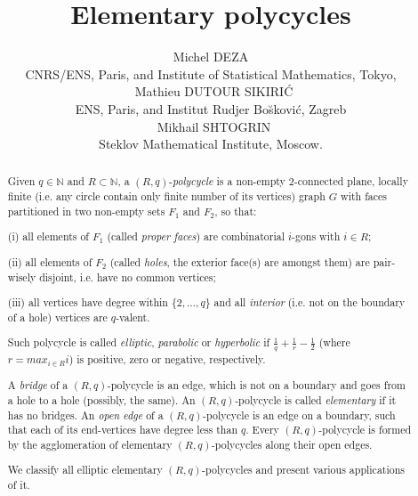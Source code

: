 \documentclass[12pt]{article}
\title{Elementary polycycles}
\date{}
\author{Michel DEZA\\
CNRS/ENS, Paris, and Institute of Statistical Mathematics, Tokyo,\\
\ Mathieu DUTOUR SIKIRI\'C\\
ENS, Paris, and Institut Rudjer Bo\u skovi\'c, Zagreb\\
\ Mikhail SHTOGRIN\\
Steklov Mathematical Institute, Moscow.
}
\begin{document}
\newcommand{\RR}{\ensuremath{\mathbb{R}}}
\newcommand{\NN}{\ensuremath{\mathbb{N}}}
\newcommand{\QQ}{\ensuremath{\mathbb{Q}}}
\newcommand{\CC}{\ensuremath{\mathbb{C}}}
\newcommand{\ZZ}{\ensuremath{\mathbb{Z}}}
\newcommand{\TT}{\ensuremath{\mathbb{T}}}
\newtheorem{proposition}{Proposition}
\newtheorem{theorem}{Theorem}
\newtheorem{corollary}{Corollary}
\newtheorem{lemma}{Lemma}
\newtheorem{conjecture}{Conjecture}
\newtheorem{claim}{Claim}
\newtheorem{remark}{Remark}
\newtheorem{definition}{Definition}
\newcommand{\qed}{\hfill $\Box$ }
\newcommand{\proof}{\noindent{\bf Proof.}\ \ }

\maketitle
\thispagestyle{empty}


\begin{abstract}
Given $q\in \NN$ and $R\subset \NN$, a $(R,q)$-{\em polycycle} is
a non-empty $2$-connected plane, locally finite (i.e. any circle
contain only finite number of its vertices) graph $G$
with faces partitioned in two non-empty sets $F_1$ and $F_2$, so that:

(i) all elements of $F_1$ (called {\em proper faces}) are
combinatorial $i$-gons with $i\in R$;

(ii) all elements of $F_2$ (called {\em holes}, the exterior face(s)
are amongst them) are pair-wisely disjoint, i.e. have no common vertices;

(iii) all vertices have degree within $\{2,\dots,q\}$ and all 
{\em interior} (i.e. not on the boundary of a hole)
vertices are $q$-valent.

Such polycycle is called {\em elliptic}, {\em parabolic} or
{\em hyperbolic} if $\frac{1}{q} + \frac{1}{r} - \frac{1}{2}$
(where $r={max_{i \in R}i}$)
is positive, zero or negative, respectively.\\
\par
A {\em bridge} of a $(R,q)$-polycycle is an edge, which is not on a boundary
and goes from a hole to a hole (possibly, the same).
An $(R,q)$-polycycle is called {\em elementary} if it has no bridges.
An {\em open edge} of a $(R,q)$-polycycle is an edge on a boundary,
such that each of its end-vertices have degree less than $q$.
Every $(R,q)$-polycycle is formed by the agglomeration of elementary
$(R,q)$-polycycles along their open edges.\\
\par
We classify all elliptic elementary $(R,q)$-polycycles and present
various applications of it.

\end{abstract}
\end{document}
